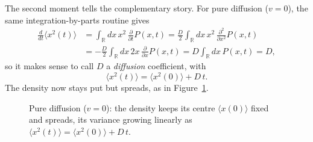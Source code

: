 The second moment tells the complementary story.
For pure diffusion ($v=0$), the same integration-by-parts routine gives
\begin{equation}\begin{split}
\frac{d}{dt}\langle x^2(t)\rangle &= \int_{\mathbb{R}} dx\, x^2\, \frac{\partial}{\partial t}P(x,t)
= \frac{D}{2}\int_{\mathbb{R}} dx\, x^2\, \frac{\partial^2}{\partial x^2}P(x,t)\\
&= -\frac{D}{2}\int_{\mathbb{R}} dx\, 2x\, \frac{\partial}{\partial x}P(x,t)
= D\int_{\mathbb{R}} dx\, P(x,t) = D,
\end{split}\end{equation}
so it makes sense to call $D$ a \emph{diffusion} coefficient, with
\begin{equation}
\langle x^2(t)\rangle = \langle x^2(0)\rangle + D\,t.
\end{equation}
The density now stays put but spreads, as in Figure~\ref{fig:diffusion}.

\begin{figure}[h!]
\centering
{}
\caption{Pure diffusion ($v=0$): the density keeps its centre $\langle x(0)\rangle$ fixed and spreads, its variance growing linearly as $\langle x^2(t)\rangle = \langle x^2(0)\rangle + D\,t$.}
\label{fig:diffusion}
\end{figure}

